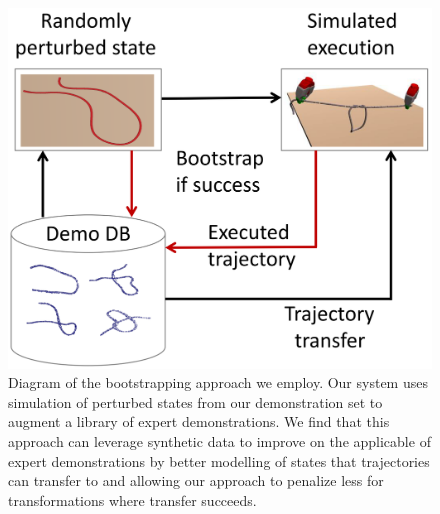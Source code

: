 \begin{figure}
  \includegraphics[width=\linewidth]{figs/teaser.png}
  \caption{Diagram of the bootstrapping approach we employ. Our system uses simulation
           of perturbed states from our demonstration set to augment a library of expert
           demonstrations. We find that this approach can leverage synthetic data to improve
           on the applicable of expert demonstrations by better modelling of states that
           trajectories can transfer to and allowing our approach to penalize less for
           transformations where transfer succeeds.}
  \label{fig:knot_steps}
\end{figure}




